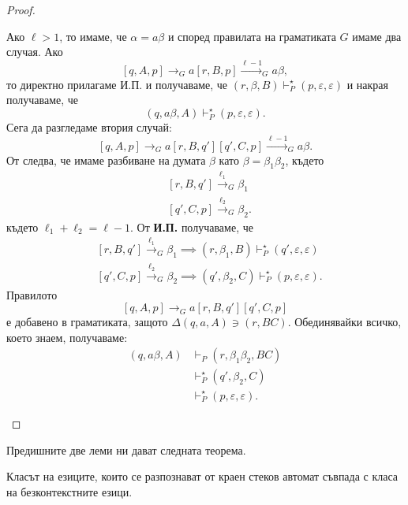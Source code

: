 \begin{proof}
\begin{description}
    Ако $\ell > 1$, то имаме, че $\alpha = a\beta$ и според правилата на граматиката $G$ имаме два случая.
    Ако
    \[[q,A,p] \rightarrow_G a[r,B,p] \stackrel{\ell-1}{\to}_G a\beta,\]
    то директно прилагаме И.П. и получаваме, че
    $(r, \beta, B) \vdash^\star_P (p, \varepsilon, \varepsilon)$ и накрая получаваме, че
    \[(q, a\beta, A) \vdash^\star_P (p, \varepsilon, \varepsilon).\]
    Сега да разгледаме втория случай:
    \[[q,A,p] \rightarrow_G a[r,B,q'][q',C,p] \stackrel{\ell-1}{\to}_G a\beta.\]
    От  следва, че имаме разбиване на думата $\beta$ като $\beta = \beta_1\beta_2$, където 
    \begin{align*}
      & [r,B,q'] \stackrel{\ell_1}{\to}_G \beta_1\\
      & [q',C,p] \stackrel{\ell_2}{\to}_G \beta_2.
    \end{align*}
    където $\ell_1 + \ell_2 = \ell - 1$.
    От {\bf И.П.} получаваме, че 
    \begin{align*}
      & [r,B,q'] \stackrel{\ell_1}{\to}_G \beta_1 \implies (r,\beta_1,B) \vdash^\star_P (q',\varepsilon,\varepsilon) \\
      & [q',C,p] \stackrel{\ell_2}{\to}_G \beta_2 \implies (q',\beta_2,C) \vdash^\star_P (p,\varepsilon,\varepsilon).
    \end{align*}
    Правилото
    \[[q,A,p] \rightarrow_G a[r,B,q'][q',C,p]\]
    е добавено в граматиката, защото $\Delta(q,a,A) \ni (r, BC)$. 
    Обединявайки всичко, което знаем, получаваме:
    \begin{align*}
      (q, a\beta, A) & \vdash_P (r, \beta_1\beta_2, BC)\\
                     & \vdash^\star_P (q', \beta_2, C)\\
                     & \vdash^\star_P (p, \varepsilon, \varepsilon).
    \end{align*}    
  \end{description}
\end{proof}

Предишните две леми ни дават следната теорема.
\begin{framed}
\begin{thm}
  \label{th:push-down-context-free}
  Класът на езиците, които се разпознават от краен стеков автомат съвпада с
  класа на безконтекстните езици.
\end{thm}
\end{framed}

